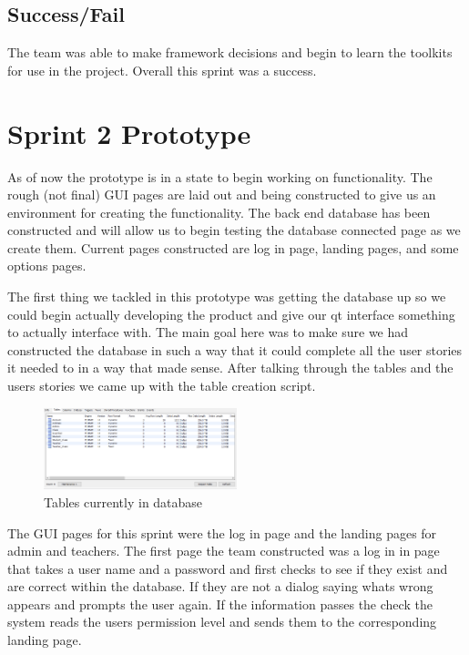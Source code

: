 \subsection{Success/Fail}
The team was able to make framework decisions and begin to learn the toolkits for use in the project. Overall this sprint was a success.\\

\section{Sprint 2 Prototype}
As of now the prototype is in a state to begin working on functionality. The rough (not final) GUI pages are laid out and being constructed to give us an environment for creating the functionality. The back end database has been constructed and will allow us to begin testing the database connected page as we create them. Current pages constructed are log in page, landing pages, and some options pages.

The first thing we tackled in this prototype was getting the database up so we could begin actually developing the product and give our qt interface something to actually interface with. The main goal here was to make sure we had constructed the database in such a way that it could complete all the user stories it needed to in a way that made sense. After talking through the tables and the users stories we came up with the table creation script.

\begin{figure}
\caption{Tables currently in database}
\centering
\includegraphics[width=0.5\textwidth]{database_tables}
\end{figure}

The GUI pages for this sprint were the log in page and the landing pages for admin and teachers. The first page the team constructed  was a log in in page that takes a user name and a password and first checks to see if they exist and are correct within the database. If they are not a dialog saying whats wrong appears and prompts the user again. If the information passes the check the system reads the users permission level and sends them to the corresponding landing page.

